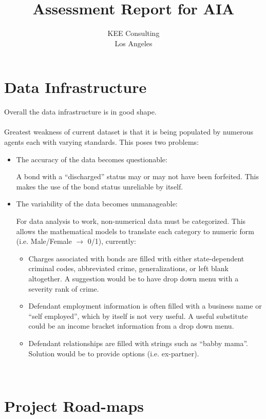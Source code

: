 \documentclass{article}
\begin{document}
\title{Assessment Report for AIA}
\author{KEE Consulting\\ 
        Los Angeles}

\maketitle



\section{Data Infrastructure}

Overall the data infrastructure is in good shape. 
~\\
~\\
Greatest weakness of current dataset is that it is being populated by numerous agents each with varying standards.  This poses two problems:

\begin{itemize}
\item The accuracy of the data becomes questionable:

A bond with a ``discharged'' status may or may not have been forfeited. This makes the use of the bond status unreliable by itself.  
 
\item The variability of the data becomes unmanageable:

For data analysis to work, non-numerical data must be categorized. This allows the mathematical models to translate each category to numeric form (i.e. Male/Female $\rightarrow$ 0/1), currently:  
\begin{itemize}
\item Charges associated with bonds are filled with either state-dependent criminal codes, abbreviated crime, generalizations, or left blank altogether. A suggestion would be to have drop down menu with a severity rank of crime.  
\item Defendant employment information is often filled with a business name or ``self employed'', which by itself is not very useful. A useful substitute could be an income bracket information from a drop down menu. 
\item Defendant relationships are filled with strings such as ``babby mama''. Solution would be to provide options (i.e. ex-partner).
\end{itemize}
\end{itemize}
~\\
\section{Project Road-maps}
\end{document}
